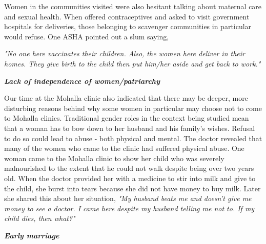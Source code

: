 Women in the communities visited were also hesitant talking about maternal care and sexual health. When offered contraceptives and asked to visit government hospitals for deliveries, those belonging to scavenger communities in particular would refuse. One ASHA pointed out a slum saying,

\textit{"No one here vaccinates their children. Also, the women here deliver in their homes. They give birth to the child then put him/her aside and get back to work."} 

\textit{\textbf{Lack of independence of women/patriarchy}}


Our time at the Mohalla clinic also indicated that there may be deeper, more disturbing reasons behind why some women in particular may choose not to come to Mohalla clinics. Traditional gender roles in the context being studied mean that a woman has to bow down to her husband and his family's wishes. Refusal to do so could lead to abuse - both physical and mental. The doctor revealed that many of the women who came to the clinic had suffered physical abuse. One woman came to the Mohalla clinic to show her child who was severely malnourished to the extent that he could not walk despite being over two years old. When the doctor provided her with a medicine to stir into milk and give to the child, she burst into tears because she did not have money to buy milk. Later she shared this about her situation, \textit{"My husband beats me and doesn’t give me money to see a doctor. I came here despite my husband telling me not to. If my child dies, then what?"}

\textit{\textbf{Early marriage}}

